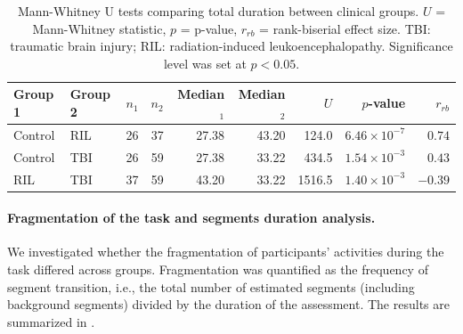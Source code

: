 \begin{chapterabstract}
        \begin{table}[htbp]
            \centering
            \begin{tabular}{l l r r r r r r r}
            \toprule
            \textbf{Group 1} & \textbf{Group 2} & $n_1$ & $n_2$ & Median$_1$ & Median$_2$ & $U$ & $p$-value & $r_{rb}$ \\
            \midrule
                Control & RIL & 26 & 37 & 27.38 & 43.20 & 124.0  & $6.46\times10^{-7}$ & $0.74$ \\
                Control & TBI & 26 & 59 & 27.38 & 33.22 & 434.5  & $1.54\times10^{-3}$ & $0.43$ \\
                RIL     & TBI & 37 & 59 & 43.20 & 33.22 & 1516.5 & $1.40\times10^{-3}$ & $-0.39$ \\
            \bottomrule
            \end{tabular}
            \caption{Mann-Whitney U tests comparing total duration between clinical groups.  $U$ = Mann-Whitney statistic, $p$ = p-value, $r_{rb}$ = rank-biserial effect size. TBI: traumatic brain injury; RIL: radiation-induced leukoencephalopathy.  Significance level was set at $p<0.05$.}
            \label{tab:duration_mannwhitney}

        \end{table}

        \paragraph{Fragmentation of the task and segments duration analysis.\\}

        We investigated whether the fragmentation of participants' activities during the task differed across groups. Fragmentation was quantified as the frequency of segment transition, i.e., the total number of estimated segments (including background segments) divided by the duration of the assessment. The results are summarized in .


\end{chapterabstract}
